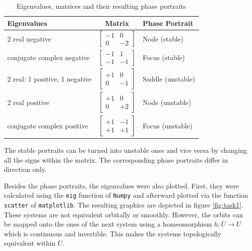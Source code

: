 \begin{table}[H]
\centering
\begin{tabular}{|l|c|l|}
\hline
\rowcolor[HTML]{FFFFC7} 
\textbf{Eigenvalues}           & \textbf{Matrix} & \textbf{Phase Portrait} \\ \hline

2 real negative                & 
$\begin{bmatrix}
-1 & 0 \\
0 & -2 
\end{bmatrix}$
& Node (stable)           \\ \hline

conjugate complex negative     &
$\begin{bmatrix}
-1 & 1 \\
-1 & -1 
\end{bmatrix}$
& Focus (stable)          \\ \hline

2 real: 1 positive, 1 negative &
$\begin{bmatrix}
+1 & 0 \\
0 & -1 
\end{bmatrix}$
& Saddle (unstable)       \\ \hline

2 real positive                &
$\begin{bmatrix}
+1 & 0 \\
0 & +2 
\end{bmatrix}$
& Node (unstable)         \\ \hline

conjugate complex positive     &
$\begin{bmatrix}
+1 & -1 \\
+1 & +1 
\end{bmatrix}$
& Focus (unstable)        \\ \hline
\end{tabular}
\caption{Eigenvalues, matrices and their resulting phase portraits}
\label{tab:task1}
\end{table}

The stable portraits can be turned into unstable ones and vice versa by changing all the signs within the matrix. The corresponding phase portraits differ in direction only. 

Besides the phase portraits, the eigenvalues were also plotted. First, they were calculated using the \texttt{eig} function of \texttt{Numpy} \cite{harris2020array} and afterward plotted via the function \texttt{scatter} of \texttt{matplotlib}. The resulting graphics are depicted in figure \ref{fig:task1}. \\

These systems are not equivalent orbitally or smoothly. However, the orbits can be mapped onto the ones of the next system using a homeomorphism $h: U \rightarrow U$ which is continuous and invertible. This makes the systems topologically equivalent within $U$. 